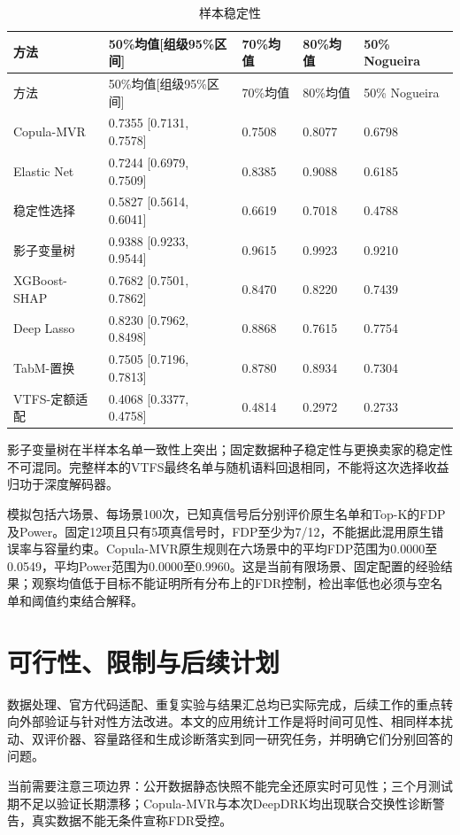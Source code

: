 \documentclass[UTF8,12pt,a4paper]{ctexart}
\begin{document}
{
\footnotesize
\begin{longtable}[]{@{}lllll@{}}
\caption{样本稳定性}\tabularnewline
\toprule\noalign{}
方法 & 50\%均值{[}组级95\%区间{]} & 70\%均值 & 80\%均值 & 50\% Nogueira \\
\midrule\noalign{}
\endfirsthead
\toprule\noalign{}
方法 & 50\%均值{[}组级95\%区间{]} & 70\%均值 & 80\%均值 & 50\% Nogueira \\
\midrule\noalign{}
\endhead
\bottomrule\noalign{}
\endlastfoot
Copula-MVR & 0.7355 {[}0.7131, 0.7578{]} & 0.7508 & 0.8077 & 0.6798 \\
Elastic Net & 0.7244 {[}0.6979, 0.7509{]} & 0.8385 & 0.9088 & 0.6185 \\
稳定性选择 & 0.5827 {[}0.5614, 0.6041{]} & 0.6619 & 0.7018 & 0.4788 \\
影子变量树 & 0.9388 {[}0.9233, 0.9544{]} & 0.9615 & 0.9923 & 0.9210 \\
XGBoost-SHAP & 0.7682 {[}0.7501, 0.7862{]} & 0.8470 & 0.8220 & 0.7439 \\
Deep Lasso & 0.8230 {[}0.7962, 0.8498{]} & 0.8868 & 0.7615 & 0.7754 \\
TabM-置换 & 0.7505 {[}0.7196, 0.7813{]} & 0.8780 & 0.8934 & 0.7304 \\
VTFS-定额适配 & 0.4068 {[}0.3377, 0.4758{]} & 0.4814 & 0.2972 & 0.2733 \\
\end{longtable}
}

影子变量树在半样本名单一致性上突出；固定数据种子稳定性与更换卖家的稳定性不可混同。完整样本的VTFS最终名单与随机语料回退相同，不能将这次选择收益归功于深度解码器。

模拟包括六场景、每场景100次，已知真信号后分别评价原生名单和Top-K的FDP及Power。固定12项且只有5项真信号时，FDP至少为7/12，不能据此混用原生错误率与容量约束。Copula-MVR原生规则在六场景中的平均FDP范围为0.0000至0.0549，平均Power范围为0.0000至0.9960。这是当前有限场景、固定配置的经验结果；观察均值低于目标不能证明所有分布上的FDR控制，检出率低也必须与空名单和阈值约束结合解释。

\section{可行性、限制与后续计划}

数据处理、官方代码适配、重复实验与结果汇总均已实际完成，后续工作的重点转向外部验证与针对性方法改进。本文的应用统计工作是将时间可见性、相同样本扰动、双评价器、容量路径和生成诊断落实到同一研究任务，并明确它们分别回答的问题。

当前需要注意三项边界：公开数据静态快照不能完全还原实时可见性；三个月测试期不足以验证长期漂移；Copula-MVR与本次DeepDRK均出现联合交换性诊断警告，真实数据不能无条件宣称FDR受控。
\end{document}
